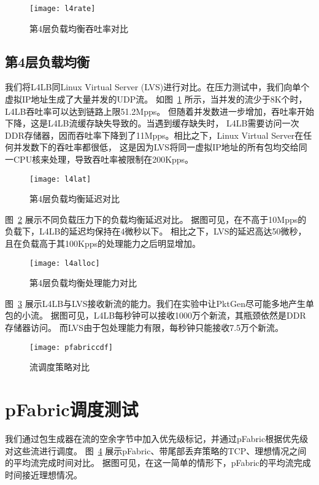 \begin{figure}[htbp]
\centering
\texttt{[image: l4rate]}
\caption{第4层负载均衡吞吐率对比} \label{fig:l4rate}
\end{figure}

\subsection{第4层负载均衡}
我们将L4LB同Linux Virtual Server (LVS)进行对比。在压力测试中，我们向单个虚拟IP地址生成了大量并发的UDP流。
如图~\ref{fig:l4rate} 所示，当并发的流少于8K个时，L4LB吞吐率可以达到链路上限51.2Mpps。
但随着并发数进一步增加，吞吐率开始下降，这是L4LB流缓存缺失导致的。当遇到缓存缺失时，
L4LB需要访问一次DDR存储器，因而吞吐率下降到了11Mpps。相比之下，Linux Virtual Server在任何并发数下的吞吐率都很低，
这是因为LVS将同一虚拟IP地址的所有包均交给同一CPU核来处理，导致吞吐率被限制在200Kpps。

\begin{figure}[htbp]
\centering
\texttt{[image: l4lat]}
\caption{第4层负载均衡延迟对比} \label{fig:l4lat}
\end{figure}
图~\ref{fig:l4lat} 展示不同负载压力下的负载均衡延迟对比。
据图可见，在不高于10Mpps的负载下，L4LB的延迟均保持在4微秒以下。
相比之下，LVS的延迟高达50微秒，且在负载高于其100Kpps的处理能力之后明显增加。

\begin{figure}[htbp]
\centering
\texttt{[image: l4alloc]}
\caption{第4层负载均衡处理能力对比} \label{fig:l4alloc}
\end{figure}
图~\ref{fig:l4alloc} 展示L4LB与LVS接收新流的能力。我们在实验中让PktGen尽可能多地产生单包的小流。
据图可见，L4LB每秒钟可以接收1000万个新流，其瓶颈依然是DDR存储器访问。
而LVS由于包处理能力有限，每秒钟只能接收7.5万个新流。

\begin{figure}[htbp]
\centering
\texttt{[image: pfabriccdf]}
\caption{流调度策略对比} \label{fig:pfabriccdf}
\end{figure}

\section{pFabric调度测试}
我们通过包生成器在流的空余字节中加入优先级标记，并通过pFabric根据优先级对这些流进行调度。
图~\ref{fig:pfabriccdf} 展示pFabric、带尾部丢弃策略的TCP、理想情况之间的平均流完成时间对比。
据图可见，在这一简单的情形下，pFabric的平均流完成时间接近理想情况。
